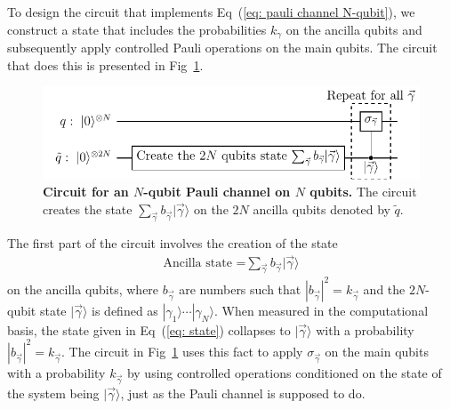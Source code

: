 \documentclass[10pt,letterpaper]{article} %
\newcommand{\fref}[1]{Fig~\ref{#1}}
\newcommand{\eref}[1]{Eq~(\ref{#1})}
\begin{document}
To design the circuit that implements \eref{eq: pauli channel N-qubit}, we construct a state that 
includes the probabilities $k_{\gamma}$ on the ancilla qubits and subsequently
apply controlled Pauli operations on the main qubits.  The circuit that does
this is presented in \fref{fig: circuit-pauli}. 


\begin{figure} %
\centering
\includegraphics{images/circuito_general.pdf}
\caption{{\bf Circuit for an $N$-qubit
Pauli channel on $N$ qubits.}
The circuit creates the state $\sum_{\vec{\gamma}} b_{\vec{\gamma}}|\vec{\gamma}\rangle$ 
on the $2N$ ancilla qubits denoted by $\tilde{q}$. }
\label{fig: circuit-pauli}
\end{figure} %

The first part of the circuit involves the creation of the state
\begin{eqnarray}
\label{eq: state}
\text{Ancilla state =} 
\sum_{\vec{\gamma}} b_{\vec{\gamma}} |\vec{\gamma} \rangle
\end{eqnarray}
on the ancilla qubits, where $b_{\vec{\gamma}}$ are numbers such that $
{|b_{\vec{\gamma}}|}^2 = k_{\vec{\gamma}}$ and
the $2N$-qubit state $|\vec{\gamma}\rangle$ is defined as $|\gamma_1\rangle
\cdots |\gamma_N\rangle$.
When measured in the computational basis, the state given in \eref{eq: state}
collapses to $|\vec{\gamma}\rangle$ with a 
probability ${|b_{\vec{\gamma}}|}^2 = k_{\vec\gamma}$. 
The circuit in \fref{fig: circuit-pauli} uses this fact
to apply $\sigma_{\vec{\gamma}}$ on the main qubits
with a probability $k_{\vec\gamma}$ by using controlled operations 
conditioned on the state of the system being $|\vec{\gamma}\rangle$,
just as the Pauli channel is supposed to do.  
% 
% 

% 
\end{document}
